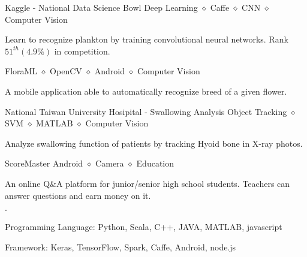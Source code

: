 \documentclass{joel_cv}
\begin{document}
\begin{proj}{Kaggle - National Data Science Bowl}
	{Deep Learning $\diamond$ Caffe $\diamond$ CNN $\diamond$ Computer Vision}
	\item Learn to recognize plankton by training convolutional neural networks. Rank $51^{th} (4.9\%)$ in competition.
\end{proj}

\begin{proj}{Flora}{ML $\diamond$ OpenCV $\diamond$ Android $\diamond$ Computer Vision}
	\item A mobile application able to automatically recognize breed of a given flower.
\end{proj}

\begin{proj}{National Taiwan University Hosipital - Swallowing Analysis}
	{Object Tracking $\diamond$ SVM $\diamond$ MATLAB $\diamond$ Computer Vision}
	\item Analyze swallowing function of patients by tracking Hyoid bone in X-ray photos.
\end{proj}

\begin{proj}{ScoreMaster}
	{Android $\diamond$ Camera $\diamond$ Education}
	\item An online Q\&A platform for junior/senior high school students. Teachers can answer questions and earn money on it.
\end{proj}

%
%

\begin{sectionItemize}{$\cdot$}
	\item Programming Language: Python, Scala, C++, JAVA, MATLAB, javascript
	\item Framework: Keras, TensorFlow, Spark, Caffe, Android, node.js
\end{sectionItemize}
\end{document}
